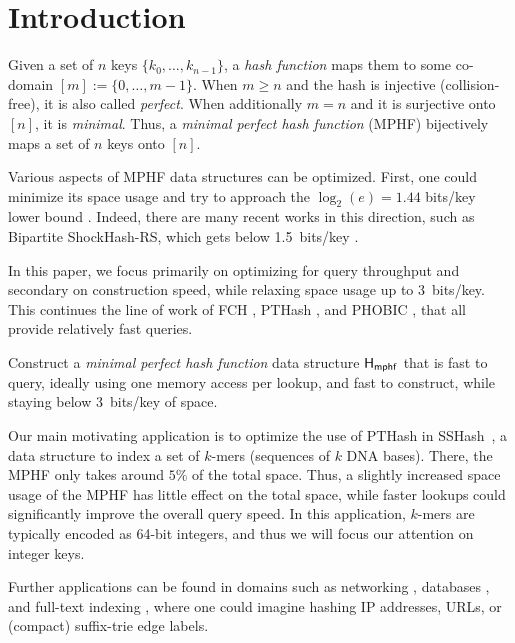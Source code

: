 \documentclass[a4paper,UKenglish,cleveref,thm-restate]{lipics-v2021}
\begin{document}
\hypersetup{pageanchor=true}
\setcounter{page}{1}


\section{Introduction}
\label{sec:org01e0707}
Given a set of \(n\) keys \(\{k_0, \dots, k_{n-1}\}\),
a \emph{hash function} maps them to some co-domain \([m] := \{0, \dots, m-1\}\).
When \(m\geq n\) and the hash is injective (collision-free), it is also called \emph{perfect}.
When additionally \(m=n\) and it is surjective onto \([n]\), it is \emph{minimal}.
Thus, a \emph{minimal perfect hash function} (MPHF) bijectively maps a set of \(n\) keys onto \([n]\).

Various aspects of MPHF data structures can be optimized.
First, one could minimize its space usage and try to
approach the \(\log_2(e)=1.44\) bits/key lower bound \cite{mehlhorn82_mphf_size}.
Indeed, there are many recent works in this direction, such as Bipartite
ShockHash-RS, which gets below 1.5~bits/key \cite{shockhash,bipartite-shockhash,phf-thesis}.

In this paper, we focus primarily on optimizing for query throughput and
secondary on construction speed, while relaxing space usage up to 3~bits/key.
This continues the line of work of FCH \cite{fch}, PTHash \cite{pthash,pthash-2}, and
PHOBIC \cite{phobic}, that all provide relatively fast queries.

Construct a \emph{minimal perfect hash function}
data structure \(\mathsf{H_{mphf}}\) that is fast to query, ideally using one memory access
per lookup,
and fast to construct, while staying below 3~bits/key of space.

Our main motivating application is to optimize the use of PTHash in SSHash~\cite{sshash}, a data structure to index a set of $k$-mers (sequences
of \(k\) DNA bases).
There, the MPHF only takes around \(5\%\) of the total space. Thus, a slightly
increased space usage of the MPHF has little effect on the total space, while
faster lookups could significantly improve the overall query speed. In this application,
$k$-mers are typically encoded as 64-bit integers, and thus we will focus our
attention on integer keys.

Further applications can be found in domains such as networking \cite{Lu_2006},
databases \cite{Chang_2005}, and
full-text indexing \cite{Belazzougui_2014}, where one could imagine hashing IP addresses,
URLs, or (compact) suffix-trie edge labels.
\end{document}
